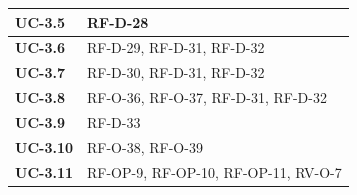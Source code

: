 \begin{longtable}{ p{} p{} }
\textbf{UC-3.5} & RF-D-28 \\ \midrule
\textbf{UC-3.6} & RF-D-29, RF-D-31, RF-D-32 \\ \midrule
\textbf{UC-3.7} & RF-D-30, RF-D-31, RF-D-32 \\ \midrule
\textbf{UC-3.8} & RF-O-36, RF-O-37, RF-D-31, RF-D-32 \\ \midrule
\textbf{UC-3.9} & RF-D-33 \\ \midrule
\textbf{UC-3.10} & RF-O-38, RF-O-39 \\ \midrule
\textbf{UC-3.11} & RF-OP-9, RF-OP-10, RF-OP-11, RV-O-7 \\

\end{longtable}

